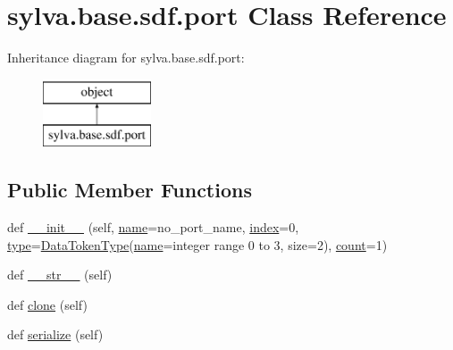 \hypertarget{classsylva_1_1base_1_1sdf_1_1port}{}\section{sylva.\+base.\+sdf.\+port Class Reference}
\label{classsylva_1_1base_1_1sdf_1_1port}
Inheritance diagram for sylva.\+base.\+sdf.\+port\+:\begin{figure}[H]
\begin{center}
\leavevmode
\includegraphics[height=2.000000cm]{classsylva_1_1base_1_1sdf_1_1port}
\end{center}
\end{figure}
\subsection*{Public Member Functions}
\begin{DoxyCompactItemize}
\item 
def \hyperlink{classsylva_1_1base_1_1sdf_1_1port_a648789838e7d9ff8d8cd26537ed006ad}{\+\_\+\+\_\+init\+\_\+\+\_\+} (self, \hyperlink{classsylva_1_1base_1_1sdf_1_1port_ace0eb23bb9f3e4a75e6a94f0961a6f99}{name}=\textquotesingle{}no\+\_\+port\+\_\+name\textquotesingle{}, \hyperlink{classsylva_1_1base_1_1sdf_1_1port_a4ed6db96ef0a6fb3d9b8f36c59bf7bdd}{index}=0, \hyperlink{classsylva_1_1base_1_1sdf_1_1port_af04b13138d55895bfd1083eb3e772f58}{type}=\hyperlink{classsylva_1_1base_1_1sdf_1_1_data_token_type}{Data\+Token\+Type}(\hyperlink{classsylva_1_1base_1_1sdf_1_1port_ace0eb23bb9f3e4a75e6a94f0961a6f99}{name}=\textquotesingle{}integer range 0 to 3\textquotesingle{}, size=2), \hyperlink{classsylva_1_1base_1_1sdf_1_1port_a628b66dd64830393bcf8d88b85023016}{count}=1)
\item 
def \hyperlink{classsylva_1_1base_1_1sdf_1_1port_a81a42bad6d299ec55b3d1482439d452f}{\+\_\+\+\_\+str\+\_\+\+\_\+} (self)
\item 
def \hyperlink{classsylva_1_1base_1_1sdf_1_1port_ae5c6adc9c86e717d12901d73699bb432}{clone} (self)
\item 
def \hyperlink{classsylva_1_1base_1_1sdf_1_1port_a19793d8e6190538a7d5cd014b08441b4}{serialize} (self)
\end{DoxyCompactItemize}
